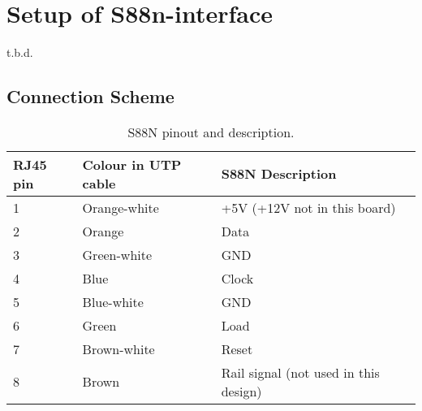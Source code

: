 \section{Setup of S88n-interface}
t.b.d.

\subsection{Connection Scheme}
	


\begin{table}[]
	\caption{S88N pinout and description.}
	\label{tab:my-table}
	\begin{tabular}{|l|l|l|}
		\hline
		\rowcolor[HTML]{9B9B9B} 
		\textbf{RJ45 pin} & \textbf{Colour in UTP cable} & \textbf{S88N Description}             \\ \hline
		1                 & Orange-white                 & +5V (+12V not in this board)          \\ \hline
		2                 & Orange                       & Data                                  \\ \hline
		3                 & Green-white                  & GND                                   \\ \hline
		4                 & Blue                         & Clock                                 \\ \hline
		5                 & Blue-white                   & GND                                   \\ \hline
		6                 & Green                        & Load                                  \\ \hline
		7                 & Brown-white                  & Reset                                 \\ \hline
		8                 & Brown                        & Rail signal (not used in this design) \\ \hline
	\end{tabular}
\end{table}